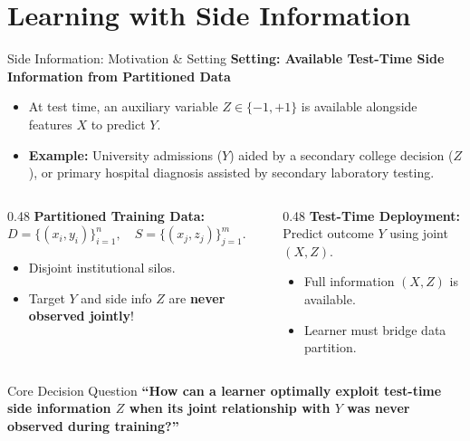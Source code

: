 \documentclass[aspectratio=169, 11pt, t, xcolor=table]{beamer}
\begin{document}
\section{Learning with Side Information}

\begin{frame}{Side Information: Motivation \& Setting}
\small
\textbf{Setting: Available Test-Time Side Information from Partitioned Data}
\begin{itemize}\itemsep=1pt
  \item At test time, an auxiliary variable $Z \in \{-1, +1\}$ is available alongside features $X$ to predict $Y$.
  \item \textbf{Example:} University admissions ($Y$) aided by a secondary college decision ($Z$), or primary hospital diagnosis assisted by secondary laboratory testing.
\end{itemize}

\vspace{0.15em}
\begin{columns}[T,onlytextwidth]
\begin{column}{0.48\textwidth}
\textcolor{IITBNavy}{\textbf{Partitioned Training Data:}}\\
\small $D = \{(x_i, y_i)\}_{i=1}^n, \quad S = \{(x_j, z_j)\}_{j=1}^m$.
\begin{itemize}\itemsep=0.5pt
  \footnotesize
  \item Disjoint institutional silos.
  \item Target $Y$ and side info $Z$ are \textbf{never observed jointly}!
\end{itemize}
\end{column}

\begin{column}{0.48\textwidth}
\textcolor{IITBNavy}{\textbf{Test-Time Deployment:}}\\
\small Predict outcome $Y$ using joint $(X, Z)$.
\begin{itemize}\itemsep=0.5pt
  \footnotesize
  \item Full information $(X,Z)$ is available.
  \item Learner must bridge data partition.
\end{itemize}
\end{column}
\end{columns}

\vspace{0.05em}
\begin{alertblock}{Core Decision Question}
\footnotesize
\textbf{``How can a learner optimally exploit test-time side information $Z$ when its joint relationship with $Y$ was never observed during training?''}
\end{alertblock}
\end{frame}
\end{document}
